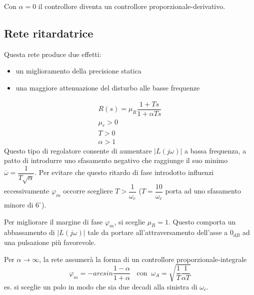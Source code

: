 \documentclass[a4paper]{report}
\begin{document}
Con $\alpha = 0$ il controllore diventa un controllore
proporzionale-derivativo.
\subsection{Rete ritardatrice}
Questa rete produce due effetti:
\begin{itemize}
\item un miglioramento della precisione statica
\item una maggiore attenuazione del disturbo alle basse frequenze
\end{itemize}
\begin{equation}
  \begin{array}{l}
    R(s) = \mu_R \dfrac{1 + Ts}{1 + \alpha Ts}\\
    \mu_r > 0\\
    T > 0\\
    \alpha > 1
  \end{array}
\end{equation}
Questo tipo di regolatore consente di aumentare $|L(j \omega)|$ a
bassa frequenza, a patto di introdurre uno sfasamento negativo che
raggiunge il suo minimo $\overline{\omega} =
\dfrac{1}{T\sqrt{\alpha}}$. Per evitare che questo ritardo di fase
introdotto influenzi eccessivamente $\varphi_m$ occorre scegliere $T >
\dfrac{1}{\omega_c}$ ($T = \dfrac{10}{\omega_c}$ porta ad uno
sfasamento minore di $6^{\circ}$).

Per migliorare il margine di fase $\varphi_m$, si sceglie $\mu_R =
1$. Questo comporta un abbassamento di $|L(j \omega)|$ tale da portare
all'attraversamento dell'asse a $0_{dB}$ ad una pulsazione pi\`u
favorevole.

Per $\alpha \to \infty$, la rete assumer\`a la forma di un controllore
proporzionale-integrale
\[
\varphi_m = - arcsin \dfrac{1 - \alpha}{1 + \alpha} \;\;\textrm{ con
}\;\; \omega_A = \sqrt{\dfrac{1}{T}\dfrac{1}{\alpha T}}
\]
es. si sceglie un polo in modo che sia due decadi alla sinistra di
$\omega_c$.
\end{document}
